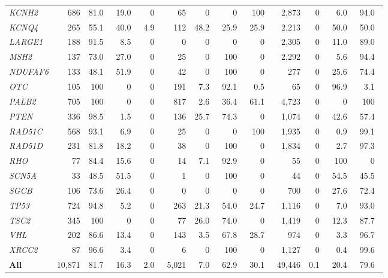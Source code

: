 \begin{tabular}{@{}l rrrr rrrr rrrr@{}}
\textit{KCNH2} & 686 & 81.0\ & 19.0\ & 0\ & 65 & 0\ & 0\ & 100\ & 2,873 & 0\ & 6.0\ & 94.0\ \\
\textit{KCNQ4} & 265 & 55.1\ & 40.0\ & 4.9\ & 112 & 48.2\ & 25.9\ & 25.9\ & 2,213 & 0\ & 50.0\ & 50.0\ \\
\textit{LARGE1} & 188 & 91.5\ & 8.5\ & 0\ & 0 & 0\ & 0\ & 0\ & 2,305 & 0\ & 11.0\ & 89.0\ \\
\textit{MSH2} & 137 & 73.0\ & 27.0\ & 0\ & 25 & 0\ & 100\ & 0\ & 2,292 & 0\ & 5.6\ & 94.4\ \\
\textit{NDUFAF6} & 133 & 48.1\ & 51.9\ & 0\ & 42 & 0\ & 100\ & 0\ & 277 & 0\ & 25.6\ & 74.4\ \\
\textit{OTC} & 105 & 100\ & 0\ & 0\ & 191 & 7.3\ & 92.1\ & 0.5\ & 65 & 0\ & 96.9\ & 3.1\ \\
\textit{PALB2} & 705 & 100\ & 0\ & 0\ & 817 & 2.6\ & 36.4\ & 61.1\ & 4,723 & 0\ & 0\ & 100\ \\
\textit{PTEN} & 336 & 98.5\ & 1.5\ & 0\ & 136 & 25.7\ & 74.3\ & 0\ & 1,074 & 0\ & 42.6\ & 57.4\ \\
\textit{RAD51C} & 568 & 93.1\ & 6.9\ & 0\ & 25 & 0\ & 0\ & 100\ & 1,935 & 0\ & 0.9\ & 99.1\ \\
\textit{RAD51D} & 231 & 81.8\ & 18.2\ & 0\ & 38 & 0\ & 100\ & 0\ & 1,834 & 0\ & 2.7\ & 97.3\ \\
\textit{RHO} & 77 & 84.4\ & 15.6\ & 0\ & 14 & 7.1\ & 92.9\ & 0\ & 55 & 0\ & 100\ & 0\ \\
\textit{SCN5A} & 33 & 48.5\ & 51.5\ & 0\ & 1 & 0\ & 100\ & 0\ & 44 & 0\ & 54.5\ & 45.5\ \\
\textit{SGCB} & 106 & 73.6\ & 26.4\ & 0\ & 0 & 0\ & 0\ & 0\ & 700 & 0\ & 27.6\ & 72.4\ \\
\textit{TP53} & 724 & 94.8\ & 5.2\ & 0\ & 263 & 21.3\ & 54.0\ & 24.7\ & 1,116 & 0\ & 7.0\ & 93.0\ \\
\textit{TSC2} & 345 & 100\ & 0\ & 0\ & 77 & 26.0\ & 74.0\ & 0\ & 1,419 & 0\ & 12.3\ & 87.7\ \\
\textit{VHL} & 202 & 86.6\ & 13.4\ & 0\ & 143 & 3.5\ & 67.8\ & 28.7\ & 974 & 0\ & 3.3\ & 96.7\ \\
\textit{XRCC2} & 87 & 96.6\ & 3.4\ & 0\ & 6 & 0\ & 100\ & 0\ & 1,127 & 0\ & 0.4\ & 99.6\ \\
\midrule
\textbf{All} & 10,871 & 81.7\ & 16.3\ & 2.0\ & 5,021 & 7.0\ & 62.9\ & 30.1\ & 49,446 & 0.1\ & 20.4\ & 79.6\ \\
\bottomrule
\end{tabular}

